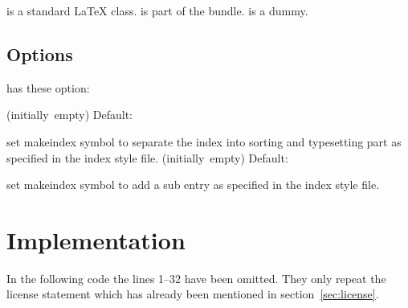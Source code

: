 \documentclass{cnpkgdoc}
\newcommand*\Default[1]{%
  \hfill\llap
    {%
      \ifblank{#1}%
        {(initially~empty)}%
        {Default:~\code{#1}}%
    }%
  \newline
}
\begin{document}
\begin{beispiel}
  is a standard \LaTeX{} class.
  is part of the \KOMAScript{} bundle.
  is a dummy.
\end{beispiel}

\subsection{Options}
\idxcmds has these option:
\begin{beschreibung}
 \Default{@}
   set makeindex symbol to separate the index into sorting and typesetting part
   as specified in the index style file.
 \Default{!}
   set makeindex symbol to add a sub entry as specified in the index style file.
\end{beschreibung}

\printbibliography

\section{Implementation}
In the following code the lines 1--32 have been omitted. They only repeat the
license statement which has already been mentioned in section~\ref{sec:license}.

\implementation[linerange={33-1000},firstnumber=33]

{}
\printindex
\clearpage
\printindex[examples]
\end{document}
